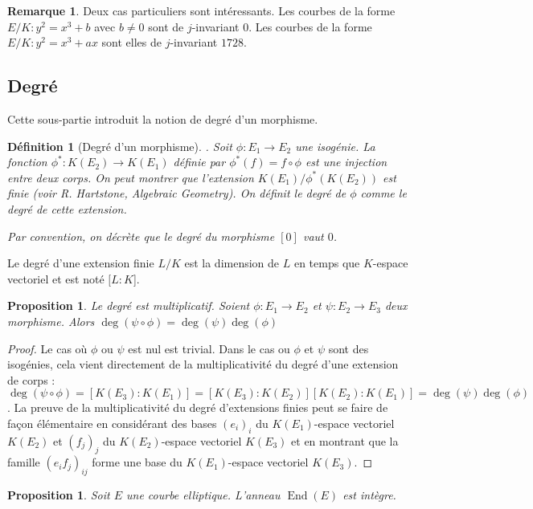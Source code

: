 \documentclass{article}
\theoremstyle{plain}%
\newtheorem{prop}[thm]{Proposition}
\newtheorem{deff}[thm]{Définition}
\theoremstyle{definition}%
\newtheorem{rem}[thm]{Remarque}
\DeclareMathOperator{\End}{End}
\begin{document}
\begin{rem}
  Deux cas particuliers sont intéressants. Les courbes de la forme $E/K: y^2 = x^3 + b$ avec $b \neq 0$ sont de $j$-invariant $0$. Les courbes de la forme $E/K : y^2 = x^3 + ax$ sont elles de $j$-invariant $1728$.
\end{rem}

\subsection{Degré}

Cette sous-partie introduit la notion de degré d'un morphisme.

\begin{deff}[Degré d'un morphisme]. 
  Soit $\phi : E_1 \to E_2$ une isogénie. La fonction $\phi^* : K(E_2) \to K(E_1)$ définie par $\phi^*(f) = f \circ \phi$ est une injection entre deux corps. On peut montrer que l'extension $K(E_1)/\phi^*(K(E_2))$ est finie (voir R. Hartstone, Algebraic Geometry). On définit le degré de $\phi$ comme le degré de cette extension.
  
  Par convention, on décrète que le degré du morphisme $[0]$ vaut $0$.
\end{deff}

Le degré d'une extension finie $L/K$ est la dimension de $L$ en temps que $K$-espace vectoriel et est noté $[L : K$].

\begin{prop}
  \label{mul_deg}
  Le degré est multiplicatif. Soient $\phi : E_1\to E_2$ et $\psi : E_2\to E_3$ deux morphisme. Alors $\deg(\psi \circ \phi) = \deg(\psi)\deg(\phi)$ 
\end{prop}

\begin{proof}
  Le cas où $\phi$ ou $\psi$ est nul est trivial. Dans le cas ou $\phi$ et $\psi$ sont des isogénies, cela vient directement de la multiplicativité du degré d'une extension de corps : $\deg(\psi \circ \phi) = [K(E_3) :K(E_1)] = [K(E_3):K(E_2)][K(E_2):K(E_1)] = \deg(\psi)\deg(\phi)$. La preuve de la multiplicativité du degré d'extensions finies peut se faire de façon élémentaire en considérant des bases $(e_i)_i$ du $K(E_1)$-espace vectoriel $K(E_2)$ et $(f_j)_j$ du $K(E_2)$-espace vectoriel $K(E_3)$ et en montrant que la famille $(e_if_j)_{ij}$ forme une base du $K(E_1)$-espace vectoriel $K(E_3)$.
\end{proof}


\begin{prop}
  Soit $E$ une courbe elliptique. L'anneau $\End(E)$ est intègre.
\end{prop}
\end{document}
